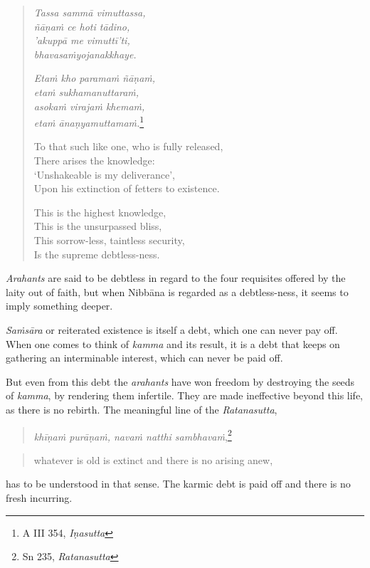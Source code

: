 \begin{quote}
\emph{Tassa sammā vimuttassa,}\\
\emph{ñāṇaṁ ce hoti tādino,}\\
\emph{'akuppā me vimuttī'ti,}\\
\emph{bhavasaṁyojanakkhaye.}

\emph{Etaṁ kho paramaṁ ñāṇaṁ,}\\
\emph{etaṁ sukhamanuttaraṁ,}\\
\emph{asokaṁ virajaṁ khemaṁ,}\\
\emph{etaṁ ānaṇyamuttamaṁ.}\footnote{A III 354, \emph{Iṇasutta}}

To that such like one, who is fully released,\\
There arises the knowledge:\\
`Unshakeable is my deliverance',\\
Upon his extinction of fetters to existence.

This is the highest knowledge,\\
This is the unsurpassed bliss,\\
This sorrow-less, taintless security,\\
Is the supreme debtless-ness.
\end{quote}

\emph{Arahants} are said to be debtless in regard to the four requisites offered by the laity out of faith, but when Nibbāna is regarded as a debtless-ness, it seems to imply something deeper.

\emph{Saṁsāra} or reiterated existence is itself a debt, which one can never pay off. When one comes to think of \emph{kamma} and its result, it is a debt that keeps on gathering an interminable interest, which can never be paid off.

But even from this debt the \emph{arahants} have won freedom by destroying the seeds of \emph{kamma}, by rendering them infertile. They are made ineffective beyond this life, as there is no rebirth. The meaningful line of the \emph{Ratanasutta},

\begin{quote}
\emph{khīṇaṁ purāṇaṁ, navaṁ natthi sambhavaṁ},\footnote{Sn 235, \emph{Ratanasutta}}
\end{quote}

\begin{quote}
whatever is old is extinct and there is no arising anew,
\end{quote}

has to be understood in that sense. The karmic debt is paid off and there is no fresh incurring.

